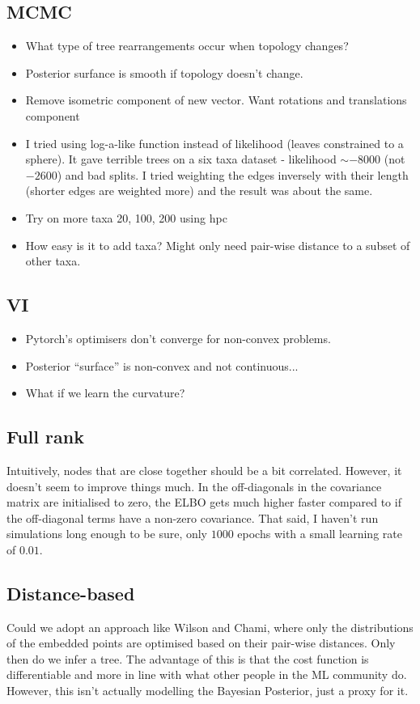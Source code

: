 \documentclass[11pt, twocolumn]{article}
\begin{document}
\subsection{MCMC}
\begin{itemize}
\item What type of tree rearrangements occur when topology changes?
\item Posterior surfance is smooth if topology doesn't change.
\item Remove isometric component of new vector. Want rotations and translations component
\item I tried using log-a-like function instead of likelihood \cite{wilson2021learning} (leaves constrained to a sphere). It gave terrible trees on a six taxa dataset - likelihood $\sim -8000$ (not $-2600$) and bad splits. I tried weighting the edges inversely with their length (shorter edges are weighted more) and the result was about the same.
\item Try on more taxa 20, 100, 200 using hpc
\item How easy is it to add taxa? Might only need pair-wise distance to a subset of other taxa.
\end{itemize}

\subsection{VI}
\begin{itemize}
\item Pytorch's optimisers don't converge for non-convex problems.
\item Posterior ``surface'' is non-convex and not continuous...
\item What if we learn the curvature?
\end{itemize}

\subsection{Full rank}
Intuitively, nodes that are close together should be a bit correlated. However, it doesn't seem to improve things much. In the off-diagonals in the covariance matrix are initialised to zero, the ELBO gets much higher faster compared to if the off-diagonal terms have a non-zero covariance. That said, I haven't run simulations long enough to be sure, only $1000$ epochs with a small learning rate of $0.01$.

\subsection{Distance-based}
Could we adopt an approach like Wilson and Chami, where only the distributions of the embedded points are optimised based on their pair-wise distances.
Only then do we infer a tree.
The advantage of this is that the cost function is differentiable and more in line with what other people in the ML community do.
However, this isn't actually modelling the Bayesian Posterior, just a proxy for it.
\end{document}
